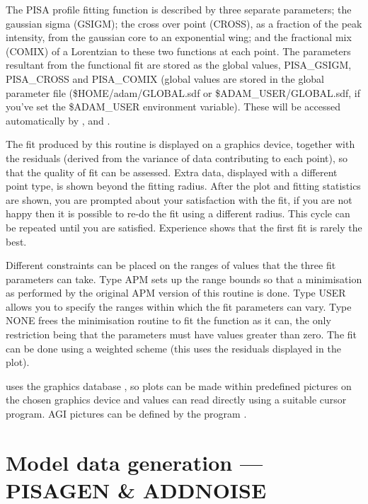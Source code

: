 The PISA profile fitting function is described by three separate
parameters; the gaussian sigma (GSIGM); the cross over point (CROSS),
as a fraction of the peak intensity, from the gaussian core to an
exponential wing; and the fractional mix (COMIX) of a Lorentzian to
these two functions at each point.
The parameters resultant from the functional fit are stored as the
global values, PISA\_GSIGM, PISA\_CROSS and PISA\_COMIX (global values
are stored in the global parameter file (\$HOME/adam/GLOBAL.sdf or
\$ADAM\_USER/GLOBAL.sdf, if you've set the \$ADAM\_USER environment variable).
These will be accessed automatically by ,
 and .

The fit produced by this routine is displayed on a graphics device,
together with the residuals (derived from the variance of data
contributing to each point), so that the quality of fit can be
assessed.  Extra data, displayed with a different point type, is shown
beyond the fitting radius.  After the plot and fitting statistics are
shown, you are prompted about your satisfaction with the fit, if you
are not happy then it is possible to re-do the fit using a different
radius. This cycle can be repeated until you are satisfied.
Experience shows that the first fit is rarely the best.

Different constraints can be placed on the ranges of values that the
three fit parameters can take. Type APM sets up the range bounds so
that a minimisation as performed by the original APM version of this
routine is done. Type USER allows you to specify the ranges within
which the fit parameters can vary.  Type NONE frees the minimisation
routine to fit the function as it can, the only restriction being that
the parameters must have values greater than zero.  The fit can be
done using a weighted scheme (this uses the residuals displayed in the
plot).

 uses the graphics database , so
plots can be made within predefined pictures on the chosen graphics
device and values can read directly using a suitable cursor
program. AGI pictures can be defined by the program .

\section{Model data generation --- PISAGEN \& ADDNOISE}

